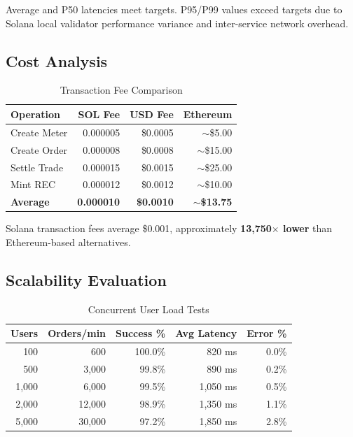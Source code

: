 \documentclass[conference]{IEEEtran}
\begin{document}
Average and P50 latencies meet targets. P95/P99 values exceed targets due to Solana local validator performance variance and inter-service network overhead.

\subsection{Cost Analysis}

\begin{table}[htbp]
\caption{Transaction Fee Comparison}
\begin{center}
\begin{tabular}{l r r r}
\toprule
\textbf{Operation} & \textbf{SOL Fee} & \textbf{USD Fee} & \textbf{Ethereum} \\
\midrule
Create Meter & 0.000005 & \$0.0005 & $\sim$\$5.00 \\
Create Order & 0.000008 & \$0.0008 & $\sim$\$15.00 \\
Settle Trade & 0.000015 & \$0.0015 & $\sim$\$25.00 \\
Mint REC & 0.000012 & \$0.0012 & $\sim$\$10.00 \\
\textbf{Average} & \textbf{0.000010} & \textbf{\$0.0010} & \textbf{$\sim$\$13.75} \\
\bottomrule
\end{tabular}
\label{tab:cost}
\end{center}
\end{table}

Solana transaction fees average \$0.001, approximately \textbf{13,750$\times$ lower} than Ethereum-based alternatives.

\subsection{Scalability Evaluation}

\begin{table}[htbp]
\caption{Concurrent User Load Tests}
\begin{center}
\begin{tabular}{r r r r r}
\toprule
\textbf{Users} & \textbf{Orders/min} & \textbf{Success \%} & \textbf{Avg Latency} & \textbf{Error \%} \\
\midrule
100 & 600 & 100.0\% & 820 ms & 0.0\% \\
500 & 3,000 & 99.8\% & 890 ms & 0.2\% \\
1,000 & 6,000 & 99.5\% & 1,050 ms & 0.5\% \\
2,000 & 12,000 & 98.9\% & 1,350 ms & 1.1\% \\
5,000 & 30,000 & 97.2\% & 1,850 ms & 2.8\% \\
\bottomrule
\end{tabular}
\label{tab:scalability}
\end{center}
\end{table}
\end{document}
